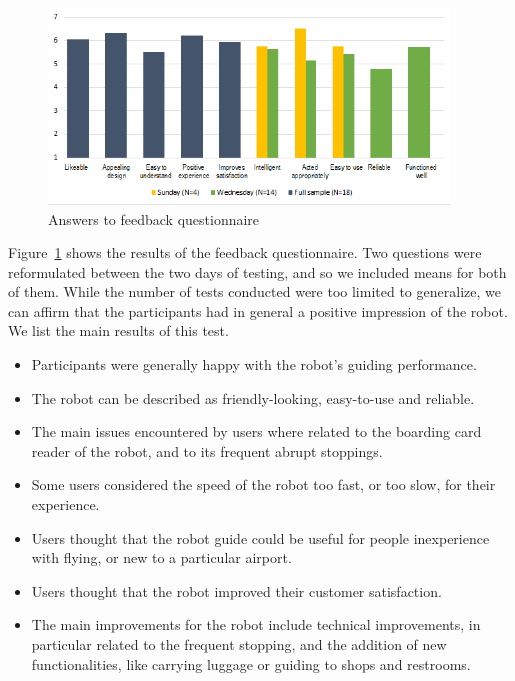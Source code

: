 \begin{figure}[tb]
  \begin{center}
  \includegraphics[width=0.95\textwidth]{img/case_study/spencer/graph_subjective_questions.png}
  \end{center}
  \caption{Answers to feedback questionnaire}
  \label{fig:feedback_questionnaire}
\end{figure}


Figure~\ref{fig:feedback_questionnaire} shows the results of the feedback questionnaire. Two questions were reformulated between the two days of testing, and so we included means for both of them. While the number of tests conducted were too limited to generalize, we can affirm that the participants had in general a positive impression of the robot. We list the main results of this test.

\begin{itemize}
\item Participants were generally happy with the robot's guiding performance.
\item The robot can be described as friendly-looking, easy-to-use and reliable.
\item The main issues encountered by users where related to the boarding card reader of the robot, and to its frequent abrupt stoppings.
\item Some users considered the speed of the robot too fast, or too slow, for their experience.
\item Users thought that the robot guide could be useful for people inexperience with flying, or new to a particular airport.
\item Users thought that the robot improved their customer satisfaction.
\item The main improvements for the robot include technical improvements, in particular related to the frequent stopping, and the addition of new functionalities, like carrying luggage or guiding to shops and restrooms.
\end{itemize}


